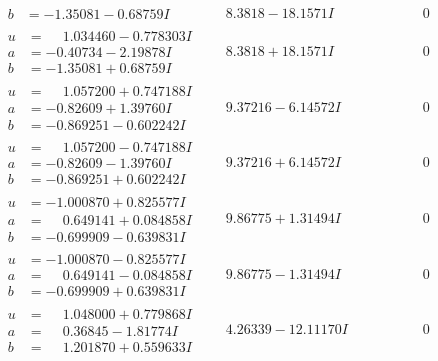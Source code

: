 \documentclass[1p]{elsarticle_modified}
\theoremstyle{definition}
\begin{document}
$$\begin{array}{c|c|c}
\begin{aligned}
b &= -1.35081 - 0.68759 I\end{aligned}
 & \phantom{-}8.3818 - 18.1571 I & \phantom{-0.000000 } 0 \\ \hline\begin{aligned}
u &= \phantom{-}1.034460 - 0.778303 I \\
a &= -0.40734 - 2.19878 I \\
b &= -1.35081 + 0.68759 I\end{aligned}
 & \phantom{-}8.3818 + 18.1571 I & \phantom{-0.000000 } 0 \\ \hline\begin{aligned}
u &= \phantom{-}1.057200 + 0.747188 I \\
a &= -0.82609 + 1.39760 I \\
b &= -0.869251 - 0.602242 I\end{aligned}
 & \phantom{-}9.37216 - 6.14572 I & \phantom{-0.000000 } 0 \\ \hline\begin{aligned}
u &= \phantom{-}1.057200 - 0.747188 I \\
a &= -0.82609 - 1.39760 I \\
b &= -0.869251 + 0.602242 I\end{aligned}
 & \phantom{-}9.37216 + 6.14572 I & \phantom{-0.000000 } 0 \\ \hline\begin{aligned}
u &= -1.000870 + 0.825577 I \\
a &= \phantom{-}0.649141 + 0.084858 I \\
b &= -0.699909 - 0.639831 I\end{aligned}
 & \phantom{-}9.86775 + 1.31494 I & \phantom{-0.000000 } 0 \\ \hline\begin{aligned}
u &= -1.000870 - 0.825577 I \\
a &= \phantom{-}0.649141 - 0.084858 I \\
b &= -0.699909 + 0.639831 I\end{aligned}
 & \phantom{-}9.86775 - 1.31494 I & \phantom{-0.000000 } 0 \\ \hline\begin{aligned}
u &= \phantom{-}1.048000 + 0.779868 I \\
a &= \phantom{-}0.36845 - 1.81774 I \\
b &= \phantom{-}1.201870 + 0.559633 I\end{aligned}
 & \phantom{-}4.26339 - 12.11170 I & \phantom{-0.000000 } 0 \\ \hline\begin{aligned}

\end{aligned}
\end{array}$$
\end{document}
